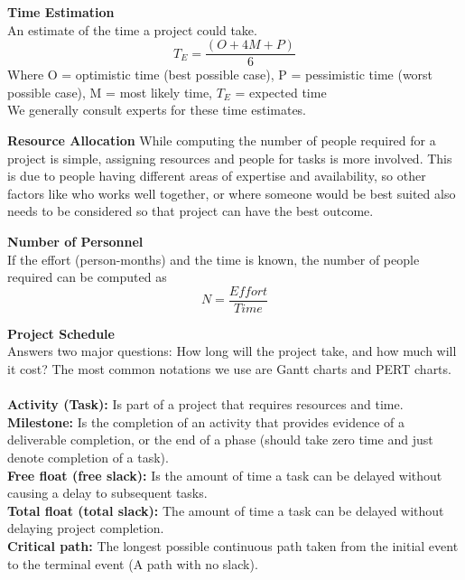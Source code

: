 \documentclass[a4paper,10pt]{article}
\begin{document}
\begin{shaded}
	\noindent \textcolor{Emerald}{\textbf{Time Estimation}} \\
	An estimate of the time a project could take. 
	\begin{equation*}
		T_{E} = \frac{(O + 4M + P)}{6}
	\end{equation*}
	Where O = optimistic time (best possible case), P = pessimistic time (worst possible case), M = most likely time, $T_{E}$ = expected time \\
	We generally consult experts for these time estimates. 
\end{shaded}
\noindent \textcolor{BlueGreen}{\textbf{Resource Allocation}} 
While computing the number of people required for a project is simple, assigning resources and people for tasks is more involved. This is due to people having different areas of expertise and availability, so other factors like who works well together, or where someone would be best suited also needs to be considered so that project can have the best outcome.
\begin{shaded}
	\noindent \textcolor{Emerald}{\textbf{Number of Personnel}} \\
	If the effort (person-months) and the time is known, the number of people required can be computed as 
	\begin{equation*}
		N = \frac{Effort}{Time}
	\end{equation*}
\end{shaded}
\noindent \textcolor{BlueGreen}{\textbf{Project Schedule}} \\
Answers two major questions: How long will the project take, and how much will it cost? The most common notations we use are Gantt charts and PERT charts. \\\\
\textbf{Activity (Task):} Is part of a project that requires resources and time. \\
\textbf{Milestone:} Is the completion of an activity that provides evidence of a deliverable completion, or the end of a phase (should take zero time and just denote completion of a task). \\
\textbf{Free float (free slack):} Is the amount of time a task can be delayed without causing a delay to subsequent tasks. \\
\textbf{Total float (total slack):} The amount of time a task can be delayed without delaying project completion. \\
\textbf{Critical path:} The longest possible continuous path taken from the initial event to the terminal event (A path with no slack). \\
\end{document}
